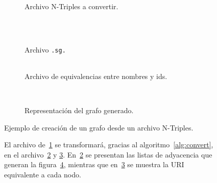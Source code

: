 \begin{figure}[t]
  \centering
  \begin{subfigure}[b]{\textwidth}
    \centering
    \begin{tabular}{c}
      
    \end{tabular}
    \caption{Archivo N-Triples a convertir.}
    \label{fig:nt:orig}
  \end{subfigure}
  \\[0.5cm]
  \begin{subfigure}[b]{.25\textwidth}
    \centering
    \begin{tabular}{c}
      
    \end{tabular}
    \caption{Archivo \tt{.sg}.}
    \label{fig:nt:sg}
  \end{subfigure}
  \begin{subfigure}[b]{.70\textwidth}
    \centering
    \begin{tabular}{c}
      
    \end{tabular}
    \caption{Archivo de equivalencias entre nombres y ids.}
    \label{fig:nt:names}
  \end{subfigure}
  \\[0.5cm]
  \begin{subfigure}[b]{\textwidth}
    \centering
    \caption{Representación del grafo generado.}
    \label{fig:nt:graph}
  \end{subfigure}

  \caption{Ejemplo de creación de un grafo desde un archivo
  N-Triples.}\label{fig:nt-to-graph}
  \vspace{-.2cm}
  \caption*{\small
    El archivo de~\ref{fig:nt:orig} se transformará, gracias al
    algoritmo~\ref{alg:convert}, en el archivo~\ref{fig:nt:sg} y
    \ref{fig:nt:names}. En~\ref{fig:nt:sg} se presentan las listas de adyacencia
    que generan la figura~\ref{fig:nt:graph}, mientras que en~\ref{fig:nt:names}
    se muestra la URI equivalente a cada nodo.
  }
\end{figure}
